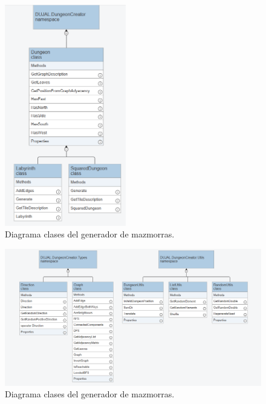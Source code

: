 \begin{figure}[H]
  \centering
    \includegraphics[width=200px,clip=true]{Dungeon_Generator.png}
  \caption{Diagrama clases del generador de mazmorras.}
  \label{fig:dungen1}
\end{figure}

\begin{figure}[H]
  \centering
    \includegraphics[width=450px,clip=true]{Dungeon_Generator_Utils.png}
  \caption{Diagrama clases del generador de mazmorras.}
  \label{fig:dungen2}
\end{figure}

